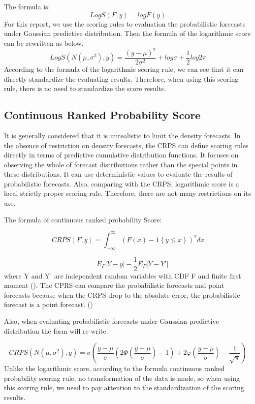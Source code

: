 \documentclass{monashthesis}
\theoremstyle{definition}
\theoremstyle{definition}
\theoremstyle{definition}
\theoremstyle{remark}
\begin{document}
The formula is: \[
      LogS(F,y)=logF(y)
  \] For this report, we use the scoring rules to evaluation the
probabilistic forecasts under Gaussian predictive distribution. Then the
formula of the logarithmic score can be rewritten as below. \[
      LogS(N(\mu,\sigma^2),y)=\frac{(y-\mu)^2}{2\sigma^2}+log\sigma+\frac{1}{2}log2\pi
  \] According to the formula of the logarithmic scoring rule, we can
see that it can directly standardize the evaluating results. Therefore,
when using this scoring rule, there is no need to standardize the score
results.

\subsection{Continuous Ranked Probability
Score}\label{continuous-ranked-probability-score}

It is generally considered that it is unrealistic to limit the density
forecasts. In the absence of restriction on density forecasts, the CRPS
can define scoring rules directly in terms of predictive cumulative
distribution functions. It focuses on observing the whole of forecast
distributions rather than the special points in these distributions. It
can use deterministic values to evaluate the results of probabilistic
forecasts. Also, comparing with the CRPS, logarithmic score is a local
strictly proper scoring rule. Therefore, there are not many restrictions
on its use.

The formula of continuous ranked probability Score:

\[
       CRPS(F,y)=\int_{-\infty}^{\infty}(F(x)-1\left\{y\leq{x}\right\})^2 dx
   \]

\[
    = E_F|Y-y|-\frac{1}{2}E_F|Y-Y'|
  \] where Y and Y' are independent random variables with CDF F and
finite first moment (\textcite{GR07}). The CPRS can compare the
probabilistic forecasts and point forecasts because when the CRPS drop
to the absolute error, the probabilistic forecast is a point forecast.
(\textcite{GK14})

Also, when evaluating probabilistic forecasts under Gaussian predictive
distribution the form will re-write:

\[
       CRPS(N(\mu,\sigma^2),y)=\sigma\left(\frac{y-\mu}{\sigma}\left(2\Phi\left(\frac{y-\mu}{\sigma}\right)-1\right)+2\varphi\left(\frac{y-\mu}{\sigma}\right)-\frac{1}{\sqrt{\pi}}\right)
   \] Unlike the logarithmic score, according to the formula continuous
ranked probability scoring rule, no transformation of the data is made,
so when using this scoring rule, we need to pay attention to the
standardization of the scoring results.
\end{document}
